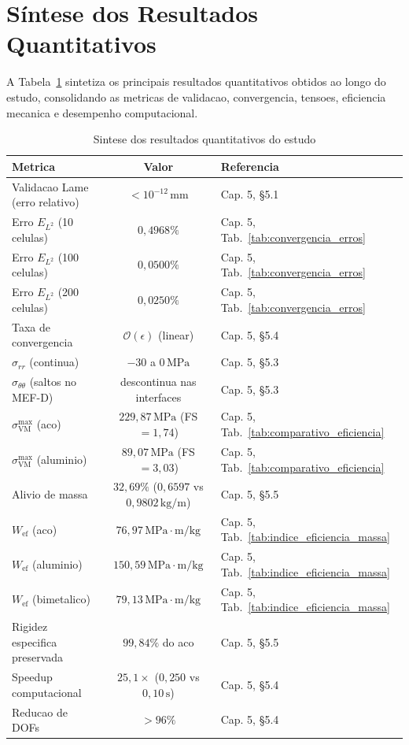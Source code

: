 \section{Síntese dos Resultados Quantitativos}\label{sec:conclusao_resultados}

A Tabela~\ref{tab:resumo_conclusao} sintetiza os principais resultados quantitativos obtidos ao longo do estudo, consolidando as metricas de validacao, convergencia, tensoes, eficiencia mecanica e desempenho computacional.

\begin{table}[htbp]
\centering
\caption{Sintese dos resultados quantitativos do estudo}
\label{tab:resumo_conclusao}
\begin{tabular}{l c l}
\hline
\textbf{Metrica} & \textbf{Valor} & \textbf{Referencia} \\ \hline
Validacao Lame (erro relativo) & $< 10^{-12}\,\text{mm}$ & Cap. 5, \S5.1 \\ \hline
Erro $E_{L^2}$ (10 celulas) & $0,4968\%$ & Cap. 5, Tab.~\ref{tab:convergencia_erros} \\ \hline
Erro $E_{L^2}$ (100 celulas) & $0,0500\%$ & Cap. 5, Tab.~\ref{tab:convergencia_erros} \\ \hline
Erro $E_{L^2}$ (200 celulas) & $0,0250\%$ & Cap. 5, Tab.~\ref{tab:convergencia_erros} \\ \hline
Taxa de convergencia & $\mathcal{O}(\epsilon)$ (linear) & Cap. 5, \S5.4 \\ \hline
$\sigma_{rr}$ (continua) & $-30$ a $0\,\text{MPa}$ & Cap. 5, \S5.3 \\ \hline
$\sigma_{\theta\theta}$ (saltos no MEF-D) & descontinua nas interfaces & Cap. 5, \S5.3 \\ \hline
$\sigma_{\text{VM}}^{\max}$ (aco) & $229,87\,\text{MPa}$ (FS $= 1,74$) & Cap. 5, Tab.~\ref{tab:comparativo_eficiencia} \\ \hline
$\sigma_{\text{VM}}^{\max}$ (aluminio) & $89,07\,\text{MPa}$ (FS $= 3,03$) & Cap. 5, Tab.~\ref{tab:comparativo_eficiencia} \\ \hline
Alivio de massa & $32,69\%$ ($0,6597$ vs $0,9802\,\text{kg/m}$) & Cap. 5, \S5.5 \\ \hline
$W_{\text{ef}}$ (aco) & $76,97\,\text{MPa}\cdot\text{m/kg}$ & Cap. 5, Tab.~\ref{tab:indice_eficiencia_massa} \\ \hline
$W_{\text{ef}}$ (aluminio) & $150,59\,\text{MPa}\cdot\text{m/kg}$ & Cap. 5, Tab.~\ref{tab:indice_eficiencia_massa} \\ \hline
$W_{\text{ef}}$ (bimetalico) & $79,13\,\text{MPa}\cdot\text{m/kg}$ & Cap. 5, Tab.~\ref{tab:indice_eficiencia_massa} \\ \hline
Rigidez especifica preservada & $99,84\%$ do aco & Cap. 5, \S5.5 \\ \hline
Speedup computacional & $25,1\times$ ($0,250$ vs $0,10\,\text{s}$) & Cap. 5, \S5.4 \\ \hline
Reducao de DOFs & $> 96\%$ & Cap. 5, \S5.4 \\ \hline
\end{tabular}
\end{table}
